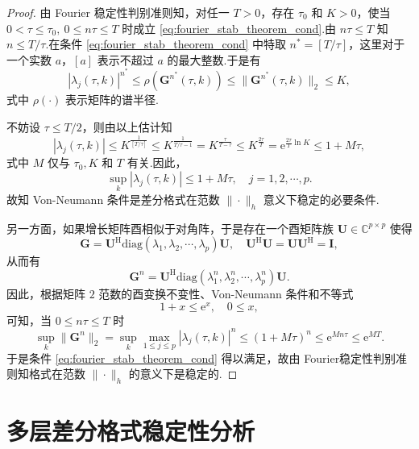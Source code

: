 \begin{proof}
    由 Fourier 稳定性判别准则知，对任一 $T>0$，存在 $\tau_0$ 和 $K>0$，使当 $0 < \tau \leq \tau_0, \ 0 \leq n\tau \leq T$ 时成立 \eqref{eq:fourier_stab_theorem_cond}.由 $n\tau \leq T$ 知 $n \leq T/\tau$.在条件 \eqref{eq:fourier_stab_theorem_cond} 中特取 $n^* = [T/\tau]$，这里对于一个实数 $a$，$ [a]$ 表示不超过 $a$ 的最大整数.于是有
    \[ |\lambda_j(\tau,k)|^{n^*} \leq \rho(\bm{G}^{n^*}(\tau,k)) \leq \|\bm{G}^{n^*}(\tau,k)\|_2 \leq K, \]
    式中 $\rho(\cdot)$ 表示矩阵的谱半径.
    
    不妨设 $\tau \leq T/2$，则由以上估计知
    \[ |\lambda_j(\tau,k)| \leq K^{\frac{1}{[T/\tau]}} \leq K^{\frac{1}{T/\tau - 1}} = K^{\frac{\tau}{T-\tau}} \leq K^{\frac{2\tau}{T}} = \mathrm{e}^{\frac{2\tau}{T}\ln K} \leq 1+M\tau, \]
    式中 $M$ 仅与 $\tau_0, K$ 和 $T$ 有关.因此，
    \[ \sup_{k}|\lambda_j(\tau,k)| \leq 1 + M\tau, \quad j=1,2,\cdots,p. \]
    故知 Von-Neumann 条件是差分格式在范数 $\|\cdot\|_h$ 意义下稳定的必要条件.

    另一方面，如果增长矩阵酉相似于对角阵，于是存在一个酉矩阵族 $\bm{U} \in \mathbb{C}^{p \times p}$ 使得
    \[ \bm{G} = \bm{U}^{\mathrm{H}}\mathrm{diag}(\lambda_1,\lambda_2,\cdots,\lambda_p)\bm{U}, \quad \bm{U}^{\mathrm{H}}\bm{U} = \bm{U}\bm{U}^{\mathrm{H}} = \bm{I}, \]
    从而有
    \[ \bm{G}^n = \bm{U}^{\mathrm{H}}\mathrm{diag}(\lambda_1^n,\lambda_2^n,\cdots,\lambda_p^n)\bm{U}. \]
    因此，根据矩阵 $2$ 范数的酉变换不变性、Von-Neumann 条件和不等式
    \[ 1+x \leq \mathrm{e}^x, \quad 0 \leq x, \]
    可知，当 $0 \leq n\tau \leq T$ 时
    \[ \sup_k \|\bm{G}^n\|_2 = \sup_k \max_{1 \leq j \leq p} |\lambda_j(\tau,k)|^n \leq (1+M\tau)^n \leq \mathrm{e}^{Mn\tau} \leq \mathrm{e}^{MT}. \]
    于是条件 \eqref{eq:fourier_stab_theorem_cond} 得以满足，故由 Fourier稳定性判别准则知格式在范数 $\|\cdot\|_h$ 的意义下是稳定的.
\end{proof}

\section{多层差分格式稳定性分析}

